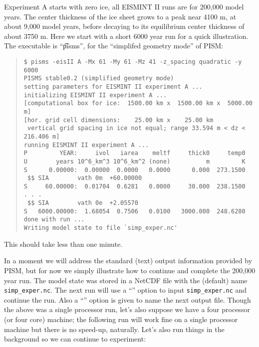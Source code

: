Experiment A starts with zero ice, all EISMINT II runs are for 200,000 model years.  The center thickness of the ice sheet grows to a peak near 4100 m, at about 9,000 model years, before decaying to its equilibrium center thickness of about 3750 m.  Here we start with a short 6000 year run for a quick illustration.  The executable is ``\t{pisms}'', for the ``simplifed geometry mode'' of PISM:

\small
\begin{quote}
\begin{verbatim}
$ pisms -eisII A -Mx 61 -My 61 -Mz 41 -z_spacing quadratic -y 6000
PISMS stable0.2 (simplified geometry mode)
setting parameters for EISMINT II experiment A ... 
initializing EISMINT II experiment A ... 
[computational box for ice:  1500.00 km x  1500.00 km x  5000.00 m]
[hor. grid cell dimensions:    25.00 km x    25.00 km
 vertical grid spacing in ice not equal; range 33.594 m < dz < 216.406 m]
running EISMINT II experiment A ...
P         YEAR:     ivol   iarea    meltf     thick0     temp0
U        years 10^6_km^3 10^6_km^2 (none)          m         K
S      0.00000:  0.00000  0.0000   0.0000      0.000  273.1500
 $$ SIA        vath 0m  +60.00000
S     60.00000:  0.01704  0.6281   0.0000     30.000  238.1500
. . .
 $$ SIA        vath 0e  +2.05570
S   6000.00000:  1.68054  0.7506   0.0100   3000.000  248.6280
done with run ...
Writing model state to file `simp_exper.nc'
\end{verbatim}
\end{quote}
\normalsize
\noindent This should take less than one minute.

In a moment we will address the standard (text) output information provided by PISM, but for now we simply illustrate how to continue and complete the 200,000 year run.  The model state was stored in a NetCDF file with the (default) name \verb|simp_exper.nc|.  The next run will use a ``'' option to input \verb|simp_exper.nc| and continue the run.  Also a ``'' option is given to name the next output file.  Though the above was a single processor run, let's also suppose we have a four processor (or four core) machine; the following run will work fine on a single processor machine but there is no speed-up, naturally.  Let's also run things in the background so we can continue to experiment:

